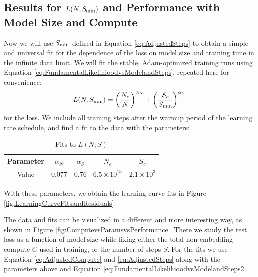 \documentclass[english]{article}
\newcommand{\be}{\begin{equation}}
\newcommand{\ee}{\end{equation}}
\begin{document}
\subsection{Results for $L(N, S_{\rm min})$ and Performance with Model Size and Compute}

Now we will use $S_{\rm min}$ defined in Equation \eqref{eq:AdjustedSteps} to obtain a  simple and universal fit for the dependence of the loss on model size and training time in the infinite data limit.  We will fit the stable, Adam-optimized training runs using Equation \eqref{eq:FundamentalLikelihioodvsModelandSteps}, repeated here for convenience:
\be
\label{eq:FundamentalLikelihioodvsModelandSteps2}
L(N, S_{\rm min}) = \left( \frac{N_c}{N} \right)^{\alpha_N}  + \left( \frac{S_c }{S_{\rm min}} \right)^{\alpha_S}
\ee
for the loss.  We include all training steps after the warmup period of the learning rate schedule, and find  a fit to the data with the parameters:

\begin{table}[h!]
\centering
\begin{tabular}{|c| c | c | c | c| } 
 \hline
Parameter & $\alpha_N$ & $\alpha_S$ & $N_c$ & $S_c$   \\ [0.5ex] 
 \hline\hline
Value  & $0.077$ & $0.76$ & $6.5 \times 10^{13}$ & $2.1 \times 10^3$  \\ 
 \hline
\end{tabular}
\vspace{0.5em}
\caption{Fits to $L(N, S)$}
\vspace{-1em}
\end{table}

With these parameters, we obtain the learning curve fits in Figure \ref{fig:LearningCurveFitsandResiduals}.  

The data and fits can be visualized in a different and more interesting way, as shown in Figure \ref{fig:ComputevsParamsvsPerformance}.  There we study the test loss as a function of model size while fixing either the total non-embedding compute $C$ used in training, or the number of steps $S$.  For the fits we use Equation \eqref{eq:AdjustedCompute} and \eqref{eq:AdjustedSteps} along with the parameters above and Equation \eqref{eq:FundamentalLikelihioodvsModelandSteps2}.
\end{document}
